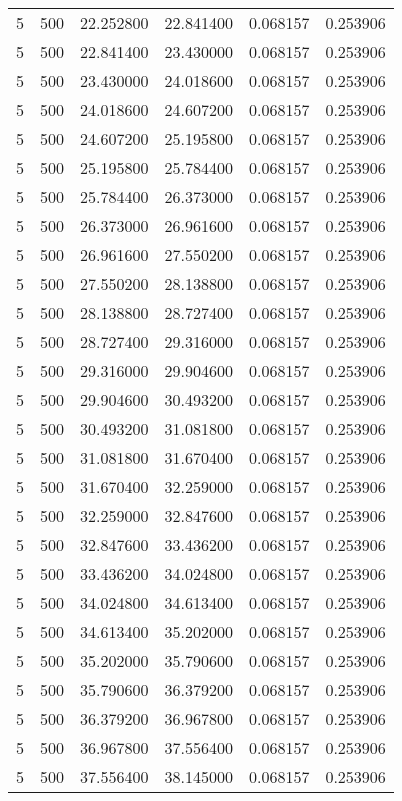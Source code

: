\begin{longtable}{rrrrrr}
5 & 500 & 22.252800 & 22.841400 & 0.068157 & 0.253906 \\
5 & 500 & 22.841400 & 23.430000 & 0.068157 & 0.253906 \\
5 & 500 & 23.430000 & 24.018600 & 0.068157 & 0.253906 \\
5 & 500 & 24.018600 & 24.607200 & 0.068157 & 0.253906 \\
5 & 500 & 24.607200 & 25.195800 & 0.068157 & 0.253906 \\
5 & 500 & 25.195800 & 25.784400 & 0.068157 & 0.253906 \\
5 & 500 & 25.784400 & 26.373000 & 0.068157 & 0.253906 \\
5 & 500 & 26.373000 & 26.961600 & 0.068157 & 0.253906 \\
5 & 500 & 26.961600 & 27.550200 & 0.068157 & 0.253906 \\
5 & 500 & 27.550200 & 28.138800 & 0.068157 & 0.253906 \\
5 & 500 & 28.138800 & 28.727400 & 0.068157 & 0.253906 \\
5 & 500 & 28.727400 & 29.316000 & 0.068157 & 0.253906 \\
5 & 500 & 29.316000 & 29.904600 & 0.068157 & 0.253906 \\
5 & 500 & 29.904600 & 30.493200 & 0.068157 & 0.253906 \\
5 & 500 & 30.493200 & 31.081800 & 0.068157 & 0.253906 \\
5 & 500 & 31.081800 & 31.670400 & 0.068157 & 0.253906 \\
5 & 500 & 31.670400 & 32.259000 & 0.068157 & 0.253906 \\
5 & 500 & 32.259000 & 32.847600 & 0.068157 & 0.253906 \\
5 & 500 & 32.847600 & 33.436200 & 0.068157 & 0.253906 \\
5 & 500 & 33.436200 & 34.024800 & 0.068157 & 0.253906 \\
5 & 500 & 34.024800 & 34.613400 & 0.068157 & 0.253906 \\
5 & 500 & 34.613400 & 35.202000 & 0.068157 & 0.253906 \\
5 & 500 & 35.202000 & 35.790600 & 0.068157 & 0.253906 \\
5 & 500 & 35.790600 & 36.379200 & 0.068157 & 0.253906 \\
5 & 500 & 36.379200 & 36.967800 & 0.068157 & 0.253906 \\
5 & 500 & 36.967800 & 37.556400 & 0.068157 & 0.253906 \\
5 & 500 & 37.556400 & 38.145000 & 0.068157 & 0.253906 \\

\end{longtable}
